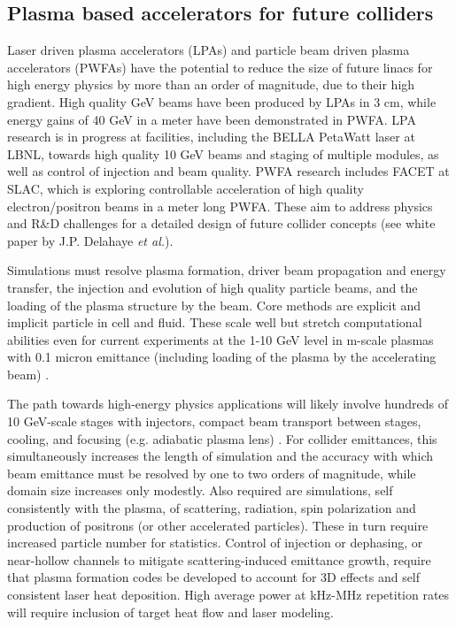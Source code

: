 \subsection{Plasma based accelerators  for future colliders}

Laser driven plasma accelerators  (LPAs) \cite{EsareyRMP09} and particle beam driven plasma accelerators (PWFAs) have the potential to reduce the size of future linacs for high energy physics by more than an order of magnitude, due to their high gradient.  High quality GeV beams have been produced by LPAs in 3 cm, while  energy gains of 40 GeV in a meter have been demonstrated in PWFA.   LPA research is in progress at facilities, including the BELLA PetaWatt laser at LBNL, towards high quality 10 GeV beams and staging of multiple modules, as well as control of injection and beam quality. PWFA research includes FACET at SLAC, which is exploring controllable acceleration of high quality electron/positron beams in a meter long PWFA.  These aim to address physics and R\&D challenges for a detailed design of future collider concepts (see white paper by J.P. Delahaye \textit{et al.}).  

Simulations must resolve plasma formation, driver beam propagation and energy transfer, the injection and evolution of high quality particle beams, and the loading of the plasma structure by the beam.  Core methods are explicit and implicit particle in cell and fluid.  These scale well but stretch computational abilities even for current experiments at the 1-10 GeV level in m-scale plasmas with 0.1 micron emittance (including loading of the plasma by the accelerating beam) \cite{web}.  

The path towards high-energy physics applications will likely involve hundreds of 10 GeV-scale stages with injectors, compact beam transport between stages, cooling, and focusing (e.g. adiabatic plasma lens) \cite{Leemans09}.  For collider emittances, this simultaneously increases the length of simulation and the accuracy with which beam emittance must be resolved by one to two orders of magnitude, while domain size increases only modestly.  Also required are simulations, self consistently with the plasma, of scattering, radiation, spin polarization and production of positrons (or other accelerated particles).  These in turn require increased particle number for statistics.  Control of injection or dephasing, or near-hollow channels to mitigate scattering-induced emittance growth, require that plasma formation codes be developed to account for 3D effects and self consistent laser heat deposition.   High average power at kHz-MHz repetition rates will require inclusion of target heat flow and laser modeling.

